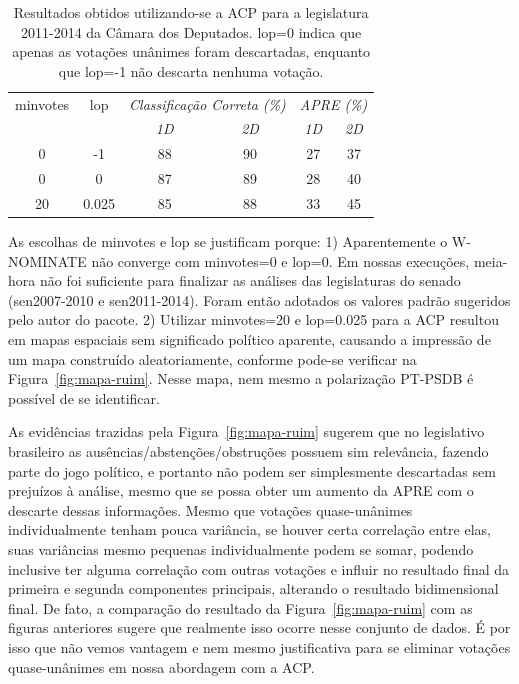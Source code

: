 \documentclass[
	article,			%
	12pt,				%
    twoside,			%
	a4paper,			%
	english,			%
	french,				%
	spanish,			%
	brazil,				%
	]{abntex2}
\newcommand\wnominate{W-NOMINATE\xspace}
\begin{document}
\begin{table}
\centering
\begin{tabular}{c c c c c c}
\textsf{minvotes} & \textsf{lop} & \multicolumn{2}{c}{\itshape Classificação Correta (\%)} & \multicolumn{2}{c}{\itshape APRE (\%)} \\
 & & \itshape 1D & \itshape 2D & \itshape 1D & \itshape 2D \\
\hline
0 & -1     & 88 & 90 & 27 & 37 \\
0 &  0     & 87 & 89 & 28 & 40\\
20 & 0.025 & 85 & 88 & 33 & 45\\
\end{tabular} 
\caption{Resultados obtidos utilizando-se a ACP para a legislatura 2011-2014 da Câmara dos Deputados. \textsf{lop=0} indica que apenas as votações unânimes foram descartadas, enquanto que \textsf{lop=-1} não descarta nenhuma votação.}
\label{tab:variando-lop}
\end{table}

As escolhas de \textsf{minvotes} e \textsf{lop} se justificam porque: 1) Aparentemente o \wnominate não converge com \textsf{minvotes=0} e \textsf{lop=0}. Em nossas execuções, meia-hora não foi suficiente para finalizar as análises das legislaturas do senado (sen2007-2010 e sen2011-2014). Foram então adotados os valores padrão sugeridos pelo autor do pacote. 2) Utilizar \textsf{minvotes=20} e \textsf{lop=0.025} para a ACP resultou em mapas espaciais sem significado político aparente, causando a impressão de um mapa construído aleatoriamente, conforme pode-se verificar na Figura~\ref{fig:mapa-ruim}. Nesse mapa, nem mesmo a polarização PT-PSDB é possível de se identificar. 

As evidências trazidas pela Figura~\ref{fig:mapa-ruim} sugerem que no legislativo brasileiro as ausências/abstenções/obstruções possuem sim relevância, fazendo parte do jogo político, e portanto não podem ser simplesmente descartadas sem prejuízos à análise, mesmo que se possa obter um aumento da APRE com o descarte dessas informações.
Mesmo que votações quase-unânimes individualmente tenham pouca variância, se houver certa correlação entre elas, suas variâncias mesmo pequenas individualmente podem se somar, podendo inclusive ter alguma correlação com outras votações e influir no resultado final da primeira e segunda componentes principais, alterando o resultado bidimensional final. De fato, a comparação do resultado da Figura~\ref{fig:mapa-ruim} com as figuras anteriores sugere que realmente isso ocorre nesse conjunto de dados. É por isso que não vemos vantagem e nem mesmo justificativa para se eliminar votações quase-unânimes em nossa abordagem com a ACP.
\end{document}
